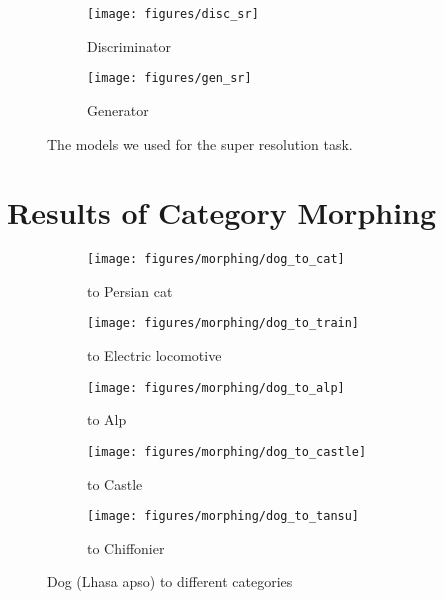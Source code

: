 \documentclass{article}
\begin{document}
\begin{figure}[ht]
    \centering
    \begin{subfigure}{0.55\textwidth}
        \texttt{[image: figures/disc\_sr]}
        \caption{\label{fig:resnets_sr_dis} Discriminator}
    \end{subfigure}
    \begin{subfigure}{0.325\textwidth}
        \texttt{[image: figures/gen\_sr]}
        \caption{\label{fig:resnets_sr_gen} Generator}
    \end{subfigure}
    \caption{\label{fig:resnets_sr}The models we used for the super resolution task.}
\end{figure}







\clearpage
\section{\label{apdsec:condgen_morph}Results of Category Morphing}
\begin{figure}[htp]
	\centering
	\begin{subfigure}{0.8\textwidth}
	    \texttt{[image: figures/morphing/dog\_to\_cat]}
	    \caption{to Persian cat} 
    \end{subfigure}
    \begin{subfigure}{0.8\textwidth}
	    \texttt{[image: figures/morphing/dog\_to\_train]}
	    \caption{to Electric locomotive} 
    \end{subfigure}
    \begin{subfigure}{0.8\textwidth}
	    \texttt{[image: figures/morphing/dog\_to\_alp]}
	    \caption{to Alp} 
    \end{subfigure}
    \begin{subfigure}{0.8\textwidth}
	    \texttt{[image: figures/morphing/dog\_to\_castle]}
	    \caption{to Castle} 
    \end{subfigure}
	\begin{subfigure}{0.8\textwidth}
	    \texttt{[image: figures/morphing/dog\_to\_tansu]}
	    \caption{to Chiffonier} 
    \end{subfigure}
    \caption{Dog (Lhasa apso) to different categories} 
\end{figure}
\end{document}

